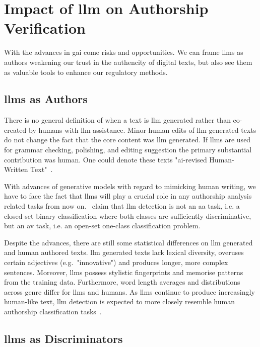 \section{Impact of \acs{llm} on Authorship Verification}
\label{sec:llm_impact}

With the advances in \ac{gai} come risks and opportunities.
We can frame \acp{llm} as authors weakening our trust in the authencity of digital texts, but also see them as valuable tools to enhance our regulatory methods.

\subsection{\acsp{llm} as Authors}
There is no general definition of when a text is \ac{llm} generated rather than co-created by humans with \ac{llm} assistance.
Minor human edits of \ac{llm} generated texts do not change the fact that the core content was \ac{llm} generated.
If \acp{llm} are used for grammar checking, polishing, and editing suggestion the primary substantial contribution was human.
One could denote these texts "\ac{ai}-revised Human-Written Text"~\citep{wang_stumbling_2024}.

With advances of generative models with regard to mimicking human writing, we have to face the fact that \acp{llm} will play a crucial role in any authorship analysis related tasks from now on.
\citet{llm_detection_av_2025}\ claim that \ac{llm} detection is not an \ac{aa} task, i.e. a closed-set binary classification where both classes are sufficiently discriminative, but an \ac{av} task, i.e. an open-set one-class classification problem. 

Despite the advances, there are still some statistical differences on \ac{llm} generated and human authored texts.
\ac{llm} generated texts lack lexical diversity, overuses certain adjectives (e.g.\ "innovative") and produces longer, more complex sentences.
Moreover, \acp{llm} possess stylistic fingerprints and memorise patterns from the training data.
Furthermore, word length averages and distributions across genre differ for \acp{llm} and humans.
As \acp{llm} continue to produce increasingly human-like text, \ac{llm} detection is expected to more closely resemble human authorship classification tasks~\citep{llm_detection_av_2025}.


\subsection{\acsp{llm} as Discriminators}
\label{sec:llm_discriminator}

